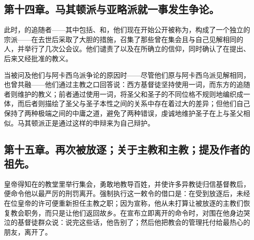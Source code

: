 
\subsection{第十四章。马其顿派与亚略派就一事发生争论。}

此时，的追随者——其中包括、和，他们现在开始公开被称为，构成了一个独立的宗派——在去世后采取了大胆的措施，召集了那些曾在集会且与自己见解相同的人，并举行了几次公会议。他们谴责了以及在所确立的信仰，同时确认了在提出、后来又经批准的教义。\par

当被问及他们与阿卡西乌派争论的原因时——尽管他们原与阿卡西乌派见解相同，也曾共融——他们通过主教之口回答说：西方基督徒坚持使用一词，而东方的追随者则维护的教义；前者通过使用一词，将圣父和圣子的不同位格不规则地编织成一体，而后者则描绘了圣父与圣子本性之间的关系中存在着过大的差异；但他们自己保持了两种极端之间的中庸之道，避免了两种错误，虔诚地维护圣子在上与圣父相似。马其顿派正是通过这样的申辩来为自己辩护。\par


\subsection{第十五章。再次被放逐；关于主教和主教；提及作者的祖先。}

皇帝得知在的教堂里举行集会，勇敢地教导百姓，并使许多异教徒归信基督教后，便命令他以最严厉的刑罚离开。强制执行这一敕令的借口是：在受到放逐后，未经在位皇帝的许可便重新担任主教之职；因为宣称，他从未打算让被放逐的主教们恢复教会职务，而只是让他们返回故乡。在宣布立即离开的命令时，对围在他身边哭泣的基督徒群众说：说完这些话，他告别了；然后他把教会的管理托付给最热心的朋友，离开了。\par

